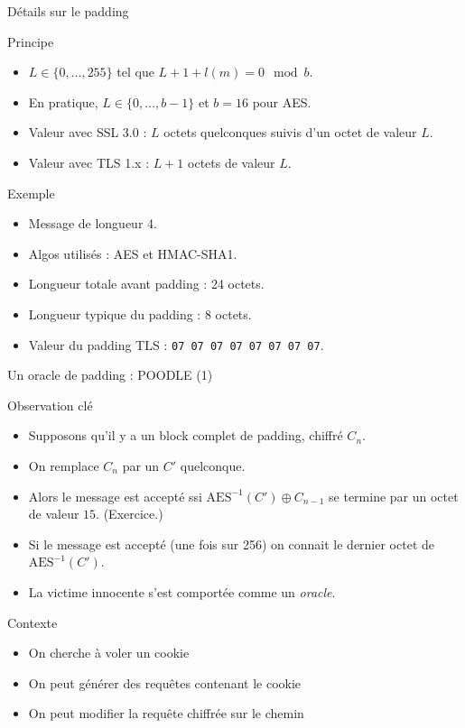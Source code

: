 \documentclass{mpg-ep-slides}
\begin{document}
\begin{frame}{Détails sur le padding}
  \begin{block}{Principe}
    \begin{itemize}
      \item $L \in \{ 0, \dots, 255 \}$ tel que \( L + 1 + l(m) = 0 \mod b \).
      \item En pratique, \( L \in \{ 0, \dots, b - 1 \} \) et \( b = 16 \)
        pour AES.
      \item Valeur avec SSL 3.0 : $L$ octets quelconques suivis d'un octet de
        valeur $L$.
      \item Valeur avec TLS 1.x : $L + 1$ octets de valeur $L$.
    \end{itemize}
  \end{block}

  \begin{block}{Exemple}
    \begin{itemize}
      \item Message de longueur 4.
      \item Algos utilisés : AES et HMAC-SHA1.
      \item Longueur totale avant padding : 24 octets.
      \item Longueur typique du padding : 8 octets.
      \item Valeur du padding TLS : \texttt{07 07 07 07 07 07 07 07}.
    \end{itemize}
  \end{block}
\end{frame}

\begin{frame}{Un oracle de padding : POODLE (1)}
  \begin{block}{Observation clé}
    \begin{itemize}
      \item Supposons qu'il y a un block complet de padding, chiffré $C_n$.
      \item On remplace $C_n$ par un $C'$ quelconque.
      \item Alors le message est accepté ssi $\text{AES}^{-1}(C') \oplus
        C_{n-1}$ se termine par un octet de valeur $15$. (Exercice.)
      \item Si le message est accepté (une fois sur 256) on connait le dernier
        octet de $\text{AES}^{-1}(C')$.
      \item La victime innocente s'est comportée comme un \emph{oracle}.
    \end{itemize}
  \end{block}

  \begin{block}{Contexte}
    \begin{itemize}
      \item On cherche à voler un cookie
      \item On peut générer des requêtes contenant le cookie
      \item On peut modifier la requête chiffrée sur le chemin
    \end{itemize}
  \end{block}
\end{frame}
\end{document}
